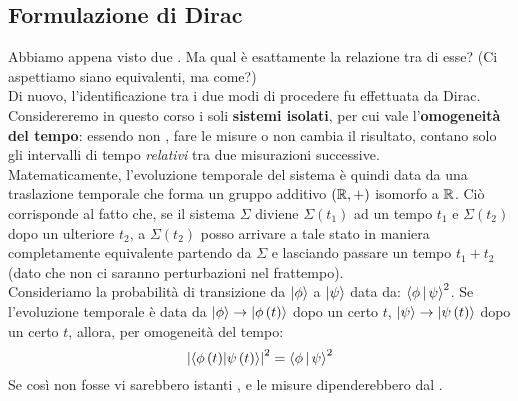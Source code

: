\documentclass[../../FisicaTeorica.tex]{subfiles}
\begin{document}
\subsection{Formulazione di Dirac}
Abbiamo appena visto due . Ma qual è esattamente la relazione tra di esse? (Ci aspettiamo siano equivalenti, ma come?)\\
Di nuovo, l'identificazione tra i due modi di procedere fu effettuata da Dirac.\\
Considereremo in questo corso i soli \textbf{sistemi isolati}, per cui vale l'\textbf{omogeneità del tempo}: essendo non , fare le misure  o  non cambia il risultato, contano solo gli intervalli di tempo \textit{relativi} tra due misurazioni successive.\\ Matematicamente, l'evoluzione temporale del sistema è quindi data da una traslazione temporale che forma un gruppo additivo $(\mathbb{R},+)$ isomorfo a $\mathbb{R}$.
Ciò corrisponde al fatto che, se il sistema $\Sigma$ diviene $\Sigma\left(t_1\right)$ ad un tempo $t_1$ e $\Sigma\left(t_2\right)$ dopo un ulteriore $t_2$, a $\Sigma\left(t_2\right)$ posso arrivare a tale stato  in maniera completamente equivalente partendo da $\Sigma$ e lasciando passare un tempo $t_1+t_2$ (dato che non ci saranno perturbazioni nel frattempo).\\

Consideriamo la probabilità di transizione da $\Ket{\phi}$ a $\Ket{\psi}$ data da: $\Braket{\phi|\psi}^2$. 
Se l'evoluzione temporale è data da $\Ket{\phi}\to \Ket{\phi \left(t\right)}$ dopo un certo $t$, $\Ket{\psi}\to \Ket{\psi\left(t\right)}$ dopo un certo $t$, allora, per omogeneità del tempo:
\[
\left|\left\langle\phi\left(t\right)\middle|\psi\left(t\right)\right\rangle\right|^2=\Braket{\phi|\psi}^2
\]
Se così non fosse vi sarebbero istanti , e le misure dipenderebbero dal .\\
\end{document}

